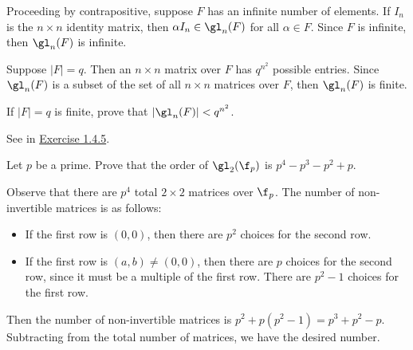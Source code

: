 \begin{solitem}
    \item [\rightimp] Proceeding by contrapositive, suppose $F$ has an infinite number of elements. If $I_n$ is the $n \times n$ identity matrix, then $\alpha I_n \in \gl_n(F)$ for all $\alpha \in F$. Since $F$ is infinite, then $\gl_n(F)$ is infinite.
    \item [\leftimp] Suppose $|F| = q$. Then an $n \times n$ matrix over $F$ has $q^{n^2}$ possible entries. Since $\gl_n(F)$ is a subset of the set of all $n \times n$ matrices over $F$, then $\gl_n(F)$ is finite.
\end{solitem}

\begin{exercise}\label{ex1.4.6}
    If $|F| = q$ is finite, prove that $|\gl_n(F)| < q^{n^2}$.
\end{exercise}

\begin{sol}
    See \leftimp in \hyperref[ex1.4.5]{Exercise 1.4.5}.
\end{sol}

\begin{exercise}\label{ex1.4.7}
    
Let $p$ be a prime. Prove that the order of $\gl_2(\f_p)$ is $p^4 - p^3 - p^2 + p$.


\end{exercise}

\begin{sol}
    Observe that there are $p^4$ total $2 \times 2$ matrices over $\f_p$. The number of non-invertible matrices is as follows:
    \begin{itemize}
        \item If the first row is $(0, 0)$, then there are $p^2$ choices for the second row.
        \item If the first row is $(a, b) \neq (0, 0)$, then there are $p$ choices for the second row, since it must be a multiple of the first row. There are $p^2 - 1$ choices for the first row.
    \end{itemize}
    Then the number of non-invertible matrices is $p^2 + p(p^2 - 1) = p^3 + p^2 - p$. Subtracting from the total number of matrices, we have the desired number.
\end{sol}

